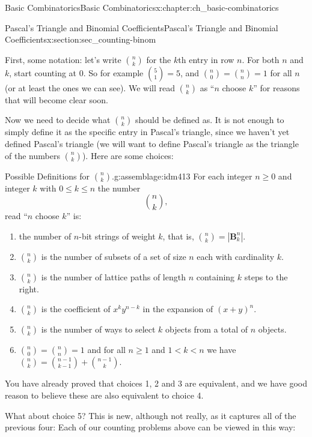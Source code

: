 \documentclass[oneside,10pt,]{book}
\numberwithin{equation}{chapter}
\def\B{\mathbf{B}}
\newcommand{\lt}{<}
\begin{document}
\begin{chapterptx}{Basic Combinatorics}{}{Basic Combinatorics}{}{}{x:chapter:ch_basic-combinatorics}
\begin{sectionptx}{Pascal's Triangle and Binomial Coefficients}{}{Pascal's Triangle and Binomial Coefficients}{}{}{x:section:sec_counting-binom}
\par
First, some notation: let's write \(\binom{n}{k}\) for the \(k\)th entry in row \(n\).  For both \(n\) and \(k\), start counting at 0.  So for example \(\binom{5}{1} = 5\), and \(\binom{n}{0} = \binom{n}{n} = 1\) for all \(n\) (or at least the ones we can see).  We will read \(\binom{n}{k}\) as ``\(n\) choose \(k\)'' for reasons that will become clear soon.%
\par
Now we need to decide what \(\binom{n}{k}\) should be defined as.  It is not enough to simply define it as the specific entry in Pascal's triangle, since we haven't yet defined Pascal's triangle (we will want to define Pascal's triangle as the triangle of the numbers \(\binom{n}{k}\)).  Here are some choices:%
\begin{assemblage}{Possible Definitions for \(\binom{n}{k}\).}{g:assemblage:idm413}%
 For each integer \(n \ge 0\) and integer \(k\) with \(0 \le k \le n\) the number%
\begin{equation*}
{n\choose k},
\end{equation*}
read ``\(n\) choose \(k\)'' is:%
\begin{enumerate}
\item{}the number of \(n\)-bit strings of weight \(k\), that is, \({n\choose k} = |\B^n_k|\).%
\item{}\({n \choose k}\) is the number of subsets of a set of size \(n\) each with cardinality \(k\).%
\item{}\({n \choose k}\) is the number of lattice paths of length \(n\) containing \(k\) steps to the right.%
\item{}\({n \choose k}\) is the coefficient of \(x^ky^{n-k}\) in the expansion of \((x+y)^n\).%
\item{}\({n \choose k}\) is the number of ways to select \(k\) objects from a total of \(n\) objects.%
\item{}\(\binom{n}{0} = \binom{n}{n} = 1\) and for all \(n \ge 1\) and \(1 \lt k \lt n\) we have \(\binom{n}{k} = \binom{n-1}{k-1} + \binom{n-1}{k}\).%
\end{enumerate}
%
\end{assemblage}
You have already proved that choices 1, 2 and 3 are equivalent, and we have good reason to believe these are also equivalent to choice 4.%
\par
What about choice 5?  This is new, although not really, as it captures all of the previous four: Each of our counting problems above can be viewed in this way:%
\begin{itemize}[label=\textbullet]

\end{itemize}
\end{sectionptx}
\end{chapterptx}
\end{document}

